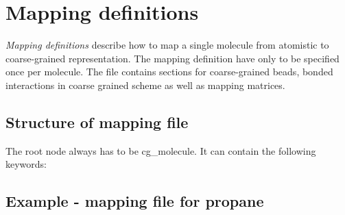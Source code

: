 \section{Mapping definitions}
{\em Mapping definitions} describe how to map a single molecule from atomistic to coarse-grained representation. The mapping definition have only to be specified once per molecule. The file contains sections for coarse-grained beads, bonded interactions in coarse grained scheme as well as mapping matrices. 

\subsection{Structure of mapping file}
The root node always has to be cg\_molecule. It can contain the following keywords:



\subsection{Example - mapping file for propane}


